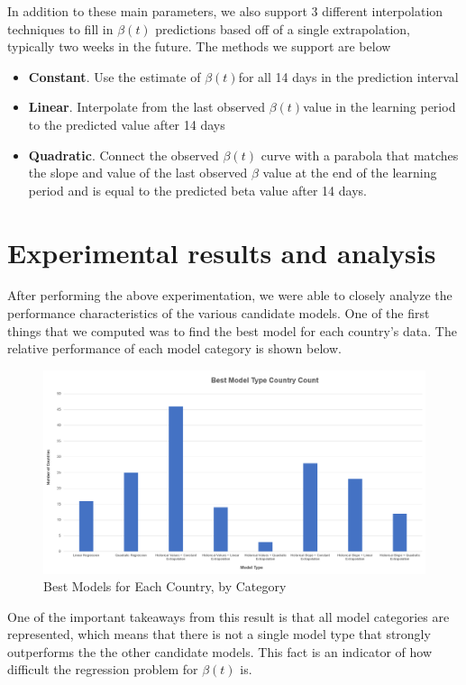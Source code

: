 \documentclass[11pt]{article}
\begin{document}
In addition to these main parameters, we also support 3 different interpolation techniques to fill in $\beta(t)$ predictions based off of a single extrapolation, typically two weeks in the future. The methods we support are below
\begin{itemize}
    \item \textbf{Constant}. Use the estimate of $\beta(t)$for all 14 days in the prediction interval
    \item \textbf{Linear}. Interpolate from the last observed $\beta(t)$value in the learning period to the predicted value after 14 days
    \item \textbf{Quadratic}. Connect the observed $\beta(t)$ curve with a parabola that matches the slope and value of the last observed $\beta$ value at the end of the learning period and is equal to the predicted beta value after 14 days.
\end{itemize}

\section{Experimental results and analysis}
After performing the above experimentation, we were able to closely analyze the performance characteristics of the various candidate models. One of the first things that we computed was to find the best model for each country's data. The relative performance of each model category is shown below.

\begin{figure}[h]
    \includegraphics[width=16cm]{images/CountryCount.png}
    \centering
    \caption{Best Models for Each Country, by Category}
    \label{fig:country-count}
\end{figure}

One of the important takeaways from this result is that all model categories are represented, which means that there is not a single model type that strongly outperforms the the other candidate models. This fact is an indicator of how difficult the regression problem for $\beta(t)$ is.
\end{document}
